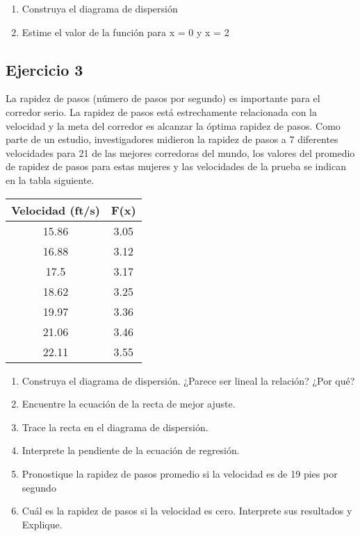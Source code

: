 \documentclass[a4paper,10pt,twocolumn]{article}
\begin{document}
	\begin{enumerate}
		\item {Construya el diagrama de dispersión}
		\item {Estime el valor de la función para x = 0 y x = 2}
	\end{enumerate}

	\subsection{Ejercicio 3}
	La rapidez de pasos (número de pasos por segundo) es importante para el corredor serio. La rapidez de pasos está estrechamente relacionada con la velocidad y la meta del corredor es alcanzar la óptima rapidez de pasos. Como parte de un estudio, investigadores midieron la rapidez de pasos a 7 diferentes velocidades para 21 de las mejores corredoras del mundo, los valores del promedio de rapidez de pasos para estas mujeres y las velocidades de la prueba se indican en la tabla siguiente.
		
	\begin{table}[h]
		\centering
		\begin{tabular}{|c|c|}
			\hline
			Velocidad (ft/s) & F(x)  \\ \hline
			15.86 & 3.05 \\ \hline
			16.88 & 3.12 \\ \hline
			17.5  & 3.17 \\ \hline
			18.62 & 3.25 \\ \hline
			19.97 & 3.36 \\ \hline
			21.06 & 3.46 \\ \hline
			22.11 &	3.55 \\ \hline
		\end{tabular}
		\label{table:EJ3}
		
	
	\end{table}

	\begin{enumerate}
		\item {	Construya el diagrama de dispersión. ¿Parece ser lineal la relación? ¿Por qué?}
		\item {Encuentre la ecuación de la recta de mejor ajuste.}
		\item {Trace la recta en el diagrama de dispersión.}
		\item {Interprete la pendiente de la ecuación de regresión.}
		\item {Pronostique la rapidez de pasos promedio si la velocidad es de 19 pies por segundo}
		\item {Cuál es la rapidez de pasos si la velocidad es cero. Interprete sus resultados y Explique.}
	\end{enumerate}
\end{document}
